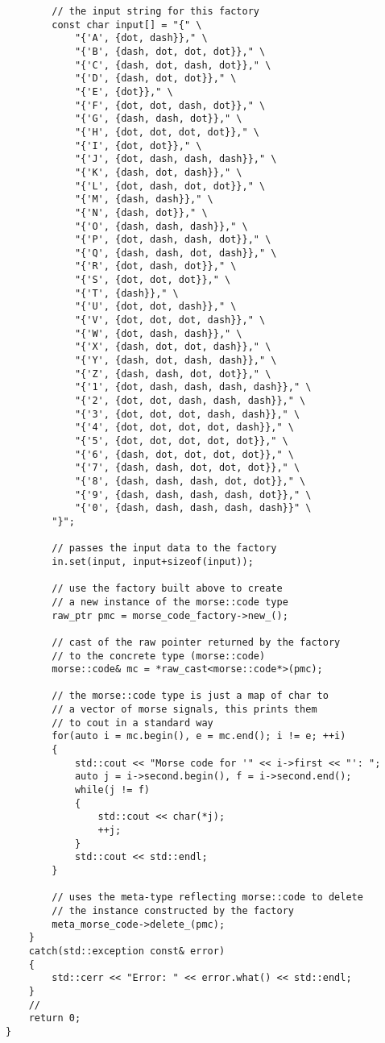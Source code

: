 \begin{verbatim}
        // the input string for this factory
        const char input[] = "{" \
            "{'A', {dot, dash}}," \
            "{'B', {dash, dot, dot, dot}}," \
            "{'C', {dash, dot, dash, dot}}," \
            "{'D', {dash, dot, dot}}," \
            "{'E', {dot}}," \
            "{'F', {dot, dot, dash, dot}}," \
            "{'G', {dash, dash, dot}}," \
            "{'H', {dot, dot, dot, dot}}," \
            "{'I', {dot, dot}}," \
            "{'J', {dot, dash, dash, dash}}," \
            "{'K', {dash, dot, dash}}," \
            "{'L', {dot, dash, dot, dot}}," \
            "{'M', {dash, dash}}," \
            "{'N', {dash, dot}}," \
            "{'O', {dash, dash, dash}}," \
            "{'P', {dot, dash, dash, dot}}," \
            "{'Q', {dash, dash, dot, dash}}," \
            "{'R', {dot, dash, dot}}," \
            "{'S', {dot, dot, dot}}," \
            "{'T', {dash}}," \
            "{'U', {dot, dot, dash}}," \
            "{'V', {dot, dot, dot, dash}}," \
            "{'W', {dot, dash, dash}}," \
            "{'X', {dash, dot, dot, dash}}," \
            "{'Y', {dash, dot, dash, dash}}," \
            "{'Z', {dash, dash, dot, dot}}," \
            "{'1', {dot, dash, dash, dash, dash}}," \
            "{'2', {dot, dot, dash, dash, dash}}," \
            "{'3', {dot, dot, dot, dash, dash}}," \
            "{'4', {dot, dot, dot, dot, dash}}," \
            "{'5', {dot, dot, dot, dot, dot}}," \
            "{'6', {dash, dot, dot, dot, dot}}," \
            "{'7', {dash, dash, dot, dot, dot}}," \
            "{'8', {dash, dash, dash, dot, dot}}," \
            "{'9', {dash, dash, dash, dash, dot}}," \
            "{'0', {dash, dash, dash, dash, dash}}" \
        "}";

        // passes the input data to the factory
        in.set(input, input+sizeof(input));

        // use the factory built above to create
        // a new instance of the morse::code type
        raw_ptr pmc = morse_code_factory->new_();

        // cast of the raw pointer returned by the factory
        // to the concrete type (morse::code)
        morse::code& mc = *raw_cast<morse::code*>(pmc);

        // the morse::code type is just a map of char to
        // a vector of morse signals, this prints them
        // to cout in a standard way
        for(auto i = mc.begin(), e = mc.end(); i != e; ++i)
        {
            std::cout << "Morse code for '" << i->first << "': ";
            auto j = i->second.begin(), f = i->second.end();
            while(j != f)
            {
                std::cout << char(*j);
                ++j;
            }
            std::cout << std::endl;
        }

        // uses the meta-type reflecting morse::code to delete
        // the instance constructed by the factory
        meta_morse_code->delete_(pmc);
    }
    catch(std::exception const& error)
    {
        std::cerr << "Error: " << error.what() << std::endl;
    }
    //
    return 0;
}
\end{verbatim}

